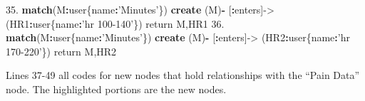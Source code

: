 \documentclass[]{book}
\newenvironment{Shaded}{\begin{snugshade}}{\end{snugshade}}
\newcommand{\KeywordTok}[1]{\textcolor[rgb]{0.13,0.29,0.53}{\textbf{#1}}}
\newcommand{\FloatTok}[1]{\textcolor[rgb]{0.00,0.00,0.81}{#1}}
\newcommand{\StringTok}[1]{\textcolor[rgb]{0.31,0.60,0.02}{#1}}
\newcommand{\OperatorTok}[1]{\textcolor[rgb]{0.81,0.36,0.00}{\textbf{#1}}}
\newcommand{\NormalTok}[1]{#1}
\begin{document}
\begin{Shaded}
\begin{Highlighting}[]
\FloatTok{35.} \KeywordTok{match}\NormalTok{(M}\OperatorTok{:}\NormalTok{user\{name}\OperatorTok{:}\StringTok{'Minutes'}\NormalTok{\}) }\KeywordTok{create}\NormalTok{ (M)}\OperatorTok{-}\StringTok{ }\NormalTok{[}\OperatorTok{:}\NormalTok{enters]->}\StringTok{ }\NormalTok{(HR1}\OperatorTok{:}\NormalTok{user\{name}\OperatorTok{:}\StringTok{'hr 100-140'}\NormalTok{\}) return M,HR1}
\FloatTok{36.} \KeywordTok{match}\NormalTok{(M}\OperatorTok{:}\NormalTok{user\{name}\OperatorTok{:}\StringTok{'Minutes'}\NormalTok{\}) }\KeywordTok{create}\NormalTok{ (M)}\OperatorTok{-}\StringTok{ }\NormalTok{[}\OperatorTok{:}\NormalTok{enters]->}\StringTok{ }\NormalTok{(HR2}\OperatorTok{:}\NormalTok{user\{name}\OperatorTok{:}\StringTok{'hr 170-220'}\NormalTok{\}) return M,HR2}
\end{Highlighting}
\end{Shaded}

Lines 37-49 all codes for new nodes that hold relationships with the
``Pain Data'' node. The highlighted portions are the new nodes.
\end{document}
